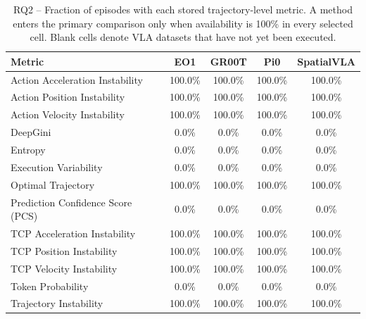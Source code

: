 \begin{table}[t]
\centering
\caption{RQ2 -- Fraction of episodes with each stored trajectory-level metric. A method enters the primary comparison only when availability is 100\% in every selected cell. Blank cells denote VLA datasets that have not yet been executed.}
\label{tab:rq2-metric-availability}
{\scriptsize
\begin{tabular}{lcccc}
\toprule
Metric & EO1 & GR00T & Pi0 & SpatialVLA \\
\midrule
Action Acceleration Instability & 100.0\% & 100.0\% & 100.0\% & 100.0\% \\
Action Position Instability & 100.0\% & 100.0\% & 100.0\% & 100.0\% \\
Action Velocity Instability & 100.0\% & 100.0\% & 100.0\% & 100.0\% \\
DeepGini & 0.0\% & 0.0\% & 0.0\% & 0.0\% \\
Entropy & 0.0\% & 0.0\% & 0.0\% & 0.0\% \\
Execution Variability & 0.0\% & 0.0\% & 0.0\% & 0.0\% \\
Optimal Trajectory & 100.0\% & 100.0\% & 100.0\% & 100.0\% \\
Prediction Confidence Score (PCS) & 0.0\% & 0.0\% & 0.0\% & 0.0\% \\
TCP Acceleration Instability & 100.0\% & 100.0\% & 100.0\% & 100.0\% \\
TCP Position Instability & 100.0\% & 100.0\% & 100.0\% & 100.0\% \\
TCP Velocity Instability & 100.0\% & 100.0\% & 100.0\% & 100.0\% \\
Token Probability & 0.0\% & 0.0\% & 0.0\% & 0.0\% \\
Trajectory Instability & 100.0\% & 100.0\% & 100.0\% & 100.0\% \\
\bottomrule
\end{tabular}
}
\end{table}

